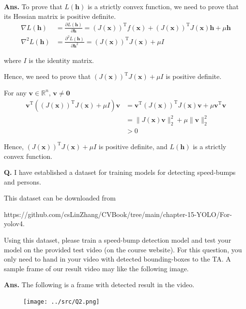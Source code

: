\documentclass[12pt, a4paper, UTF8, fontset=windows]{ctexbook}
\newcounter{problemname}
\newenvironment{problem}{\begin{shaded}\stepcounter{problemname}\par\noindent\textbf{Q\arabic{problemname}.}}{\end{shaded}\par}
\newenvironment{solution}{\par\noindent\textbf{Ans.}}{\par}
\begin{document}
\begin{solution}
    To prove that \( L(\mathbf{h}) \) is a strictly convex function, we need to prove that its Hessian matrix is positive definite.
    \begin{align*}
    \nabla L(\mathbf{h}) &= \frac{\partial L(\mathbf{h})}{\partial \mathbf{h}} = (J(\mathbf{x}))^\mathrm{T}f(\mathbf{x}) + (J(\mathbf{x}))^\mathrm{T} J(\mathbf{x})\mathbf{h} + \mu \mathbf{h} \\
    \nabla^2 L(\mathbf{h}) &= \frac{\partial^2 L(\mathbf{h})}{\partial \mathbf{h}^2} = (J(\mathbf{x}))^\mathrm{T} J(\mathbf{x}) + \mu I
    \end{align*}

    where $I$ is the identity matrix. 

    Hence, we need to prove that $ (J(\mathbf{x}))^\mathrm{T} J(\mathbf{x}) + \mu I $ is positive definite.

    For any $\mathbf{v} \in \mathbb{R}^n$, $\mathbf{v} \neq \mathbf{0}$
    \begin{align*}
        \mathbf{v}^\mathrm{T} ((J(\mathbf{x}))^\mathrm{T} J(\mathbf{x}) + \mu I) \mathbf{v} &= \mathbf{v}^\mathrm{T} (J(\mathbf{x}))^\mathrm{T} J(\mathbf{x}) \mathbf{v} + \mu \mathbf{v}^\mathrm{T} \mathbf{v} \\
        &= \| J(\mathbf{x}) \mathbf{v} \|^2_2 + \mu \| \mathbf{v} \|^2_2 \\
        &> 0
    \end{align*}

    Hence, $ (J(\mathbf{x}))^\mathrm{T} J(\mathbf{x}) + \mu I $ is positive definite, and $ L(\mathbf{h}) $ is a strictly convex function.
\end{solution}


\begin{problem}
    I have established a dataset for training models for detecting speed-bumps and persons. 
    
    This dataset can be downloaded from 
    
    https://github.com/csLinZhang/CVBook/tree/main/chapter-15-YOLO/For-yolov4.
    
    Using this dataset, please train a speed-bump detection model and test your model on the provided test video (on the course website). For this question, you only need to hand in your video with detected bounding-boxes to the TA. A sample frame of our result video may like the following image.
\end{problem}


\begin{solution}
    The following is a frame with detected result in the video.
    \begin{figure}[H]
        \centering
        \texttt{[image: ../src/Q2.png]}
        \label{fig:Q4}
    \end{figure}
\end{solution}
\end{document}
